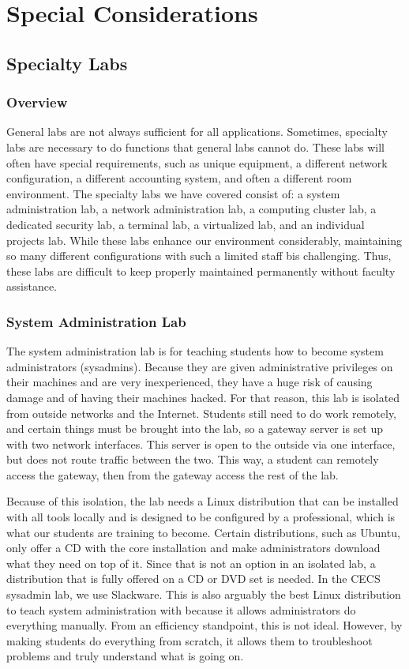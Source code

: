 \chapter{Special Considerations} \label{ch:special_considerations}
\section{Specialty Labs} \label{sec:specialty_labs}
\subsection{Overview}
General labs are not always sufficient for all applications.  Sometimes, specialty labs are necessary to do functions that general labs cannot do.  These labs will often have special requirements, such as unique equipment, a different network configuration, a different accounting system, and often a different room environment.  The specialty labs we have covered consist of:  a system administration lab, a network administration lab, a computing cluster lab, a dedicated security lab, a terminal lab, a virtualized lab, and an individual projects lab. While these labs enhance our environment considerably, maintaining so many different configurations with such a limited staff bis challenging. Thus, these labs are difficult to keep properly maintained permanently without faculty assistance.  
\subsection{System Administration Lab}
The system administration lab is for teaching students how to become system administrators (sysadmins).  Because they are given administrative privileges on their machines and are very inexperienced, they have a huge risk of causing damage and of having their machines hacked.  For that reason, this lab is isolated from outside networks and the Internet.  Students still need to do work remotely, and certain things must be brought into the lab, so a gateway server is set up with two network interfaces.  This server is open to the outside via one interface, but does not route traffic between the two.  This way, a student can remotely access the gateway, then from the gateway access the rest of the lab.  

Because of this isolation, the lab needs a Linux distribution that can be installed with all tools locally and is designed to be configured by a professional, which is what our students are training to become.  Certain distributions, such as Ubuntu, only offer a CD with the core installation and make administrators download what they need on top of it.  Since that is not an option in an isolated lab, a distribution that is fully offered on a CD or DVD set is needed.  In the CECS sysadmin lab, we use Slackware.  This is also arguably the best Linux distribution to teach system administration with because it allows administrators do everything manually.  From an efficiency standpoint, this is not ideal.  However, by making students do everything from scratch, it allows them to troubleshoot problems and truly understand what is going on.  

